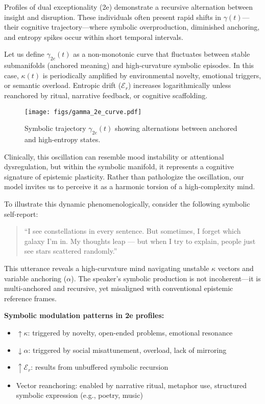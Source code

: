 Profiles of dual exceptionality (2e) demonstrate a recursive alternation between insight and disruption. These individuals often present rapid shifts in $\gamma(t)$—their cognitive trajectory—where symbolic overproduction, diminished anchoring, and entropy spikes occur within short temporal intervals.

Let us define $\gamma_{2e}(t)$ as a non-monotonic curve that fluctuates between stable submanifolds (anchored meaning) and high-curvature symbolic episodes. In this case, $\kappa(t)$ is periodically amplified by environmental novelty, emotional triggers, or semantic overload. Entropic drift ($\mathcal{E}_r$) increases logarithmically unless reanchored by ritual, narrative feedback, or cognitive scaffolding.

\begin{figure}[H]
\centering
\texttt{[image: figs/gamma\_2e\_curve.pdf]}
\caption{Symbolic trajectory $\gamma_{2e}(t)$ showing alternations between anchored and high-entropy states.}
\end{figure}

Clinically, this oscillation can resemble mood instability or attentional dysregulation, but within the symbolic manifold, it represents a cognitive signature of epistemic plasticity. Rather than pathologize the oscillation, our model invites us to perceive it as a harmonic torsion of a high-complexity mind.

\bigskip
\noindent
To illustrate this dynamic phenomenologically, consider the following symbolic self-report:

\begin{quote}
“I see constellations in every sentence. But sometimes, I forget which galaxy I’m in. My thoughts leap — but when I try to explain, people just see stars scattered randomly.”
\end{quote}

This utterance reveals a high-curvature mind navigating unstable $\kappa$ vectors and variable anchoring ($\alpha$). The speaker’s symbolic production is not incoherent—it is multi-anchored and recursive, yet misaligned with conventional epistemic reference frames.

\medskip
\noindent
\textbf{Symbolic modulation patterns in 2e profiles:}
\begin{itemize}[noitemsep]
    \item $\uparrow \kappa$: triggered by novelty, open-ended problems, emotional resonance
    \item $\downarrow \alpha$: triggered by social misattunement, overload, lack of mirroring
    \item $\uparrow \mathcal{E}_r$: results from unbuffered symbolic recursion
    \item Vector reanchoring: enabled by narrative ritual, metaphor use, structured symbolic expression (e.g., poetry, music)
\end{itemize}

